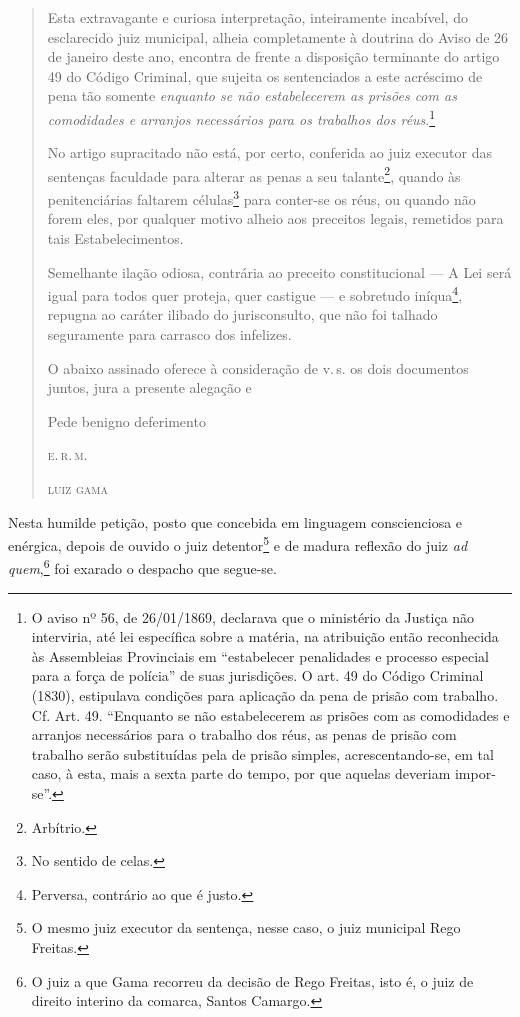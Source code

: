 \begin{quote}
Esta extravagante e curiosa interpretação, inteiramente incabível, do
esclarecido juiz municipal, alheia completamente à doutrina do Aviso de
26 de janeiro deste ano, encontra de frente a disposição terminante do
artigo 49 do Código Criminal, que sujeita os sentenciados a este
acréscimo de pena tão somente \emph{enquanto se não estabelecerem as
prisões com as comodidades e arranjos necessários para os trabalhos dos
réus}.\footnote{O aviso nº 56, de 26/01/1869, declarava que o
  ministério da Justiça não interviria, até lei específica sobre a
  matéria, na atribuição então reconhecida às Assembleias Provinciais em
  ``estabelecer penalidades e processo especial para a força de polícia''
  de suas jurisdições. O art. 49 do Código Criminal (1830), estipulava
  condições para aplicação da pena de prisão com trabalho. Cf. Art. 49.
  ``Enquanto se não estabelecerem as prisões com as comodidades e
  arranjos necessários para o trabalho dos réus, as penas de prisão com
  trabalho serão substituídas pela de prisão simples, acrescentando-se,
  em tal caso, à esta, mais a sexta parte do tempo, por que aquelas
  deveriam impor-se''.}

No artigo supracitado não está, por certo, conferida ao juiz executor
das sentenças faculdade para alterar as penas a seu talante\footnote{
  Arbítrio.}, quando às penitenciárias faltarem células\footnote{No
  sentido de celas.} para conter-se os réus, ou quando não forem eles,
por qualquer motivo alheio aos preceitos legais, remetidos para tais
Estabelecimentos.

Semelhante ilação odiosa, contrária ao preceito constitucional --- A Lei
será igual para todos quer proteja, quer castigue --- e sobretudo
iníqua\footnote{Perversa, contrário ao que é justo.}, repugna ao
caráter ilibado do jurisconsulto, que não foi talhado seguramente para
carrasco dos infelizes.

O abaixo assinado oferece à consideração de v.\,s. os dois documentos
juntos, jura a presente alegação e

\begin{flushright}
Pede benigno deferimento

\textsc{e.\,r.\,m.}

\textsc{luiz gama}
\end{flushright}
\end{quote}

Nesta humilde petição, posto que concebida em linguagem conscienciosa e
enérgica, depois de ouvido o juiz detentor\footnote{O mesmo juiz
  executor da sentença, nesse caso, o juiz municipal Rego Freitas.} e de
madura reflexão do juiz \emph{ad quem},\footnote{O juiz a que Gama
  recorreu da decisão de Rego Freitas, isto é, o juiz de direito
  interino da comarca, Santos Camargo.} foi exarado o despacho que
segue-se.

